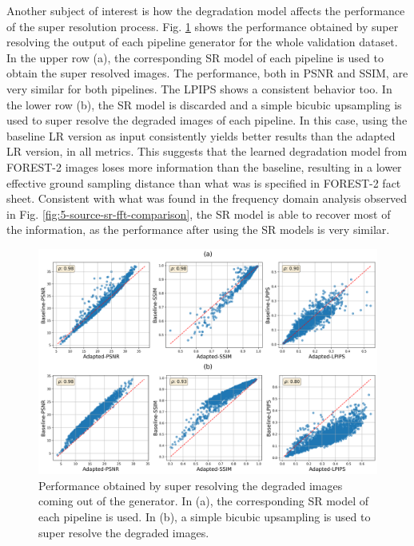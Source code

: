         Another subject of interest is how the degradation model affects the performance of the super resolution process.
        Fig. \ref{fig:5-source-domain-comparison} shows the performance obtained by super resolving the output of each pipeline generator for the whole validation dataset.
        In the upper row (a), the corresponding SR model of each pipeline is used to obtain the super resolved images. 
        The performance, both in PSNR and SSIM, are very similar for both pipelines. The LPIPS shows a consistent behavior too.
        In the lower row (b), the SR model is discarded and a simple bicubic upsampling is used to super resolve the degraded images of each pipeline. 
        In this case, using the baseline LR version as input consistently yields better results than the adapted LR version, in all metrics.
        This suggests that the learned degradation model from FOREST-2 images loses more information than the baseline, resulting in a lower effective ground sampling distance than what was is specified in FOREST-2 fact sheet.
        Consistent with what was found in the frequency domain analysis observed in Fig. \ref{fig:5-source-sr-fft-comparison}, the SR model is able to recover most of the information, as the performance after using the SR models is very similar. 
        
        \begin{figure}[H]
            \centering
            \includegraphics[width=\textwidth]{Includes/5-source-domain-comparison.png}
            \caption{Performance obtained by super resolving the degraded images coming out of the generator. 
                     In (a), the corresponding SR model of each pipeline is used. 
                     In (b), a simple bicubic upsampling is used to super resolve the degraded images. }
            \label{fig:5-source-domain-comparison}
        \end{figure}

